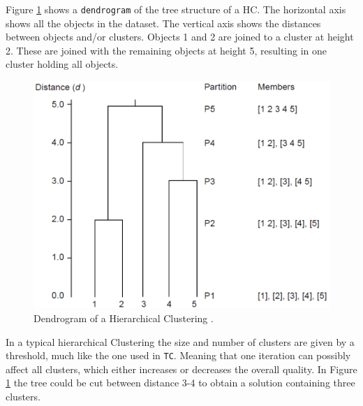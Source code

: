 \documentclass[a4paper,10pt]{article}
\theoremstyle{plain}
\theoremstyle{definition}
\begin{document}
Figure \ref{fig:hc example} shows a \texttt{dendrogram} of the tree structure of a HC. The horizontal axis shows all the objects in the dataset. The vertical axis shows the distances between objects and/or clusters. Objects 1 and 2 are joined to a cluster at height 2. These are joined with the remaining objects at height 5, resulting in one cluster holding all objects.
\begin{figure}[H]
	\centering
	\includegraphics*[scale=0.3]{./pictures/hc/hc_example.png}
	\caption{Dendrogram of a Hierarchical Clustering \cite{clusterAnalysis}.}
	\label{fig:hc example}
\end{figure}

In a typical hierarchical Clustering the size and number of clusters are given by a threshold, much like the one used in \texttt{TC}. Meaning that one iteration can possibly affect all clusters, which either increases or decreases the overall quality. In Figure \ref{fig:hc example} the tree could be cut between distance 3-4 to obtain a solution containing three clusters.

\end{document}
